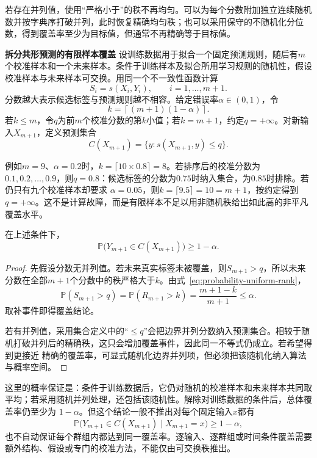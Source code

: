 若存在并列值，使用“严格小于”的秩不再均匀。可以为每个分数附加独立连续随机数并按字典序打破并列，此时恢复精确均匀秩；也可以采用保守的不随机化分位数，得到覆盖率至少为目标值，但通常不再精确等于目标值。

\par\medskip\noindent\textbf{拆分共形预测的有限样本覆盖}\quad
设训练数据用于拟合一个固定预测规则，随后有\(m\)个校准样本和一个未来样本。条件于训练样本及拟合所用学习规则的随机性，假设校准样本与未来样本可交换。用同一个不一致性函数计算
\[ S_i=s(X_i,Y_i),
  \qquad i=1,\ldots,m+1. \]
分数越大表示候选标签与预测规则越不相容。给定错误率\(\alpha\in(0,1)\)，令
\[ k=\left\lceil(m+1)(1-\alpha)\right\rceil. \]
若\(k\leq m\)，令\(q\)为前\(m\)个校准分数的第\(k\)小值；若\(k=m+1\)，约定\(q=+\infty\)。对新输入\(X_{m+1}\)，定义预测集合
\begin{equation}
  C(X_{m+1})
  =
  \{y:s(X_{m+1},y)\leq q\}.
  \label{eq:probability-split-conformal-set}
\end{equation}

例如\(m=9\)、\(\alpha=0.2\)时，\(k=\lceil10\times0.8\rceil=8\)。若排序后的校准分数为
\(0.1,0.2,\ldots,0.9\)，则\(q=0.8\)：候选标签的分数为\(0.75\)时纳入集合，为\(0.85\)时排除。若仍只有九个校准样本却要求
\(\alpha=0.05\)，则\(k=\lceil9.5\rceil=10=m+1\)，按约定得到\(q=+\infty\)。这不是计算故障，而是有限样本不足以用非随机秩给出如此高的非平凡覆盖水平。

\begin{theorem}[拆分共形的有限样本覆盖]
\label{thm:probability-split-conformal-coverage}
在上述条件下，
\[ \mathbb{P}\bigl(
    Y_{m+1}\in C(X_{m+1})\bigr)\geq 1-\alpha. \]
\end{theorem}

\begin{proof}
先假设分数无并列值。若未来真实标签未被覆盖，则\(S_{m+1}>q\)，所以未来分数在全部\(m+1\)个分数中的秩严格大于\(k\)。由式~\eqref{eq:probability-uniform-rank}，
\[ \mathbb{P}(S_{m+1}>q)
  =\mathbb{P}(R_{m+1}>k)=\frac{m+1-k}{m+1}\leq\alpha. \]
取补事件即得覆盖结论。

若有并列值，采用集合定义中的“\(\leq q\)”会把边界并列分数纳入预测集合。相较于随机打破并列后的精确秩，这只会增加覆盖事件，因此同一不等式仍成立。若希望得到更接近
精确的覆盖率，可显式随机化边界并列项，但必须把该随机化纳入算法与概率空间。
\end{proof}

这里的概率保证是：条件于训练数据后，它仍对随机的校准样本和未来样本共同取平均；若采用随机并列处理，还包括该随机性。解除对训练数据的条件后，总体覆盖率仍至少为
\(1-\alpha\)。但这个结论一般不推出对每个固定输入\(x\)都有
\[
  \mathbb{P}\bigl(
    Y_{m+1}\in C(X_{m+1})
    \mid X_{m+1}=x
  \bigr)
  \geq1-\alpha,
\]
也不自动保证每个群组内都达到同一覆盖率。逐输入、逐群组或时间条件覆盖需要额外结构、假设或专门的校准方法，不能仅由可交换秩推出。

